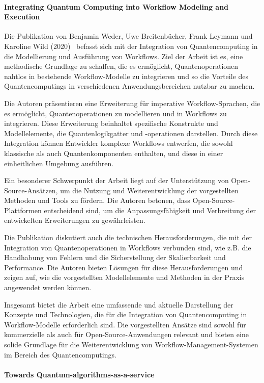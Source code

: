 \paragraph{Integrating Quantum Computing into Workflow Modeling and Execution}

Die Publikation von Benjamin Weder, Uwe Breitenbücher, Frank Leymann und Karoline Wild (2020)~\cite{Weder_2020} befasst sich mit der 
Integration von Quantencomputing in die Modellierung und Ausführung von Workflows. Ziel der Arbeit ist es, eine 
methodische Grundlage zu schaffen, die es ermöglicht, Quantenoperationen nahtlos in bestehende Workflow-Modelle zu 
integrieren und so die Vorteile des Quantencomputings in verschiedenen Anwendungsbereichen nutzbar zu machen.

Die Autoren präsentieren eine Erweiterung für imperative Workflow-Sprachen, die es ermöglicht, Quantenoperationen 
zu modellieren und in Workflows zu integrieren. Diese Erweiterung beinhaltet spezifische Konstrukte und Modellelemente, 
die Quantenlogikgatter und -operationen darstellen. Durch diese Integration können Entwickler komplexe Workflows entwerfen, 
die sowohl klassische als auch Quantenkomponenten enthalten, und diese in einer einheitlichen Umgebung ausführen.

Ein besonderer Schwerpunkt der Arbeit liegt auf der Unterstützung von Open-Source-Ansätzen, um die Nutzung und 
Weiterentwicklung der vorgestellten Methoden und Tools zu fördern. Die Autoren betonen, dass Open-Source-Plattformen 
entscheidend sind, um die Anpassungsfähigkeit und Verbreitung der entwickelten Erweiterungen zu gewährleisten.

Die Publikation diskutiert auch die technischen Herausforderungen, die mit der Integration von Quantenoperationen in 
Workflows verbunden sind, wie z.B. die Handhabung von Fehlern und die Sicherstellung der Skalierbarkeit und Performance. 
Die Autoren bieten Lösungen für diese Herausforderungen und zeigen auf, wie die vorgestellten Modellelemente und Methoden 
in der Praxis angewendet werden können.

Insgesamt bietet die Arbeit eine umfassende und aktuelle Darstellung der Konzepte und Technologien, die für die Integration 
von Quantencomputing in Workflow-Modelle erforderlich sind. Die vorgestellten Ansätze sind sowohl für kommerzielle als auch 
für Open-Source-Anwendungen relevant und bieten eine solide Grundlage für die Weiterentwicklung von Workflow-Management-Systemen 
im Bereich des Quantencomputings.

\paragraph{Towards Quantum-algorithms-as-a-service}

